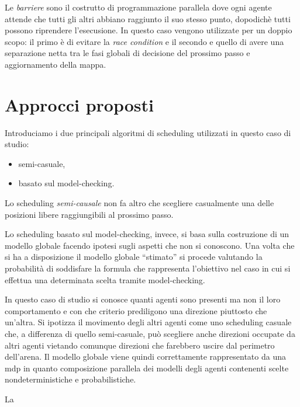 Le \emph{barriere} sono il costrutto di programmazione parallela dove ogni agente attende che tutti gli altri abbiano raggiunto il suo stesso punto, dopodichè tutti possono riprendere l'esecusione. In questo caso vengono utilizzate per un doppio scopo: il primo è di evitare la \emph{race condition} e il secondo e quello di avere una separazione netta tra le fasi globali di decisione del prossimo passo e aggiornamento della mappa.

\section{Approcci proposti}
Introduciamo i due principali algoritmi di scheduling utilizzati in questo caso di studio:
\begin{itemize}
	\item semi-casuale,
	\item basato sul model-checking.
\end{itemize}
Lo scheduling \emph{semi-causale} non fa altro che scegliere casualmente una delle posizioni libere raggiungibili al prossimo passo.

Lo scheduling basato sul model-checking, invece, si basa sulla costruzione di un modello globale facendo ipotesi sugli aspetti che non si conoscono. Una volta che si ha a disposizione il modello globale ``stimato'' si procede valutando la probabilità di soddisfare la formula che rappresenta l'obiettivo nel caso in cui si effettua una determinata scelta tramite model-checking.

In questo caso di studio si conosce quanti agenti sono presenti ma non il loro comportamento e con che criterio prediligono una direzione piuttosto che un'altra. Si ipotizza il movimento degli altri agenti come uno scheduling casuale che, a differenza di quello semi-casuale, può scegliere anche direzioni occupate da altri agenti vietando comunque direzioni che farebbero uscire dal perimetro dell'arena. Il modello globale viene quindi correttamente rappresentato da una \ac{mdp} in quanto composizione parallela dei modelli degli agenti contenenti scelte nondeterministiche e probabilistiche.

La 


